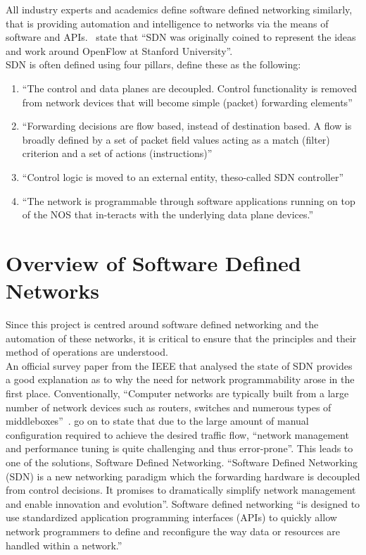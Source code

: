 All industry experts and academics define software defined networking
similarly, that is providing automation and intelligence to networks via the
means of software and APIs.~\citet{11} state that ``SDN was originally coined
to represent the ideas and work around OpenFlow at Stanford University''.\\ SDN
is often defined using four pillars, \citet{11} define these as the following:
\begin{enumerate}
    \item ``The control and data planes are decoupled. Control functionality is
          removed from network devices that will become simple (packet)
          forwarding
          elements''
    \item ``Forwarding decisions are flow based, instead of destination based.
          A flow is broadly defined by a set of packet field values acting as a
          match
          (filter) criterion and a set of actions (instructions)''
    \item ``Control logic is moved to an external entity, theso-called SDN
          controller''
    \item ``The network is programmable through software applications running
          on top of the NOS that in-teracts with the underlying data plane
          devices.''
\end{enumerate}

\section{Overview of Software Defined Networks}
\label{litreview:overview}

Since this project is centred around software defined networking and the
automation of these networks, it is critical to ensure that the principles and
their method of operations are understood.\\
An official survey paper from the IEEE that analysed the state of SDN provides
a good explanation as to why the need for network programmability arose in the
first place. Conventionally, “Computer networks are typically built from a
large number of network devices such as routers, switches and numerous types of
middleboxes”~\cite{1}. \citet{1} go on to state that due to the large
amount of manual configuration required to achieve the desired traffic flow,
“network management and performance tuning is quite challenging and thus
error-prone”.
This leads to one of the solutions, Software Defined Networking. “Software
Defined Networking (SDN) is a new networking paradigm which the forwarding
hardware is decoupled from control decisions. It promises to dramatically
simplify network management and enable innovation and evolution”. Software
defined networking “is designed to use standardized application programming
interfaces (APIs) to quickly allow network programmers to define and
reconfigure the way data or resources are handled within a network.” \cite{9}

